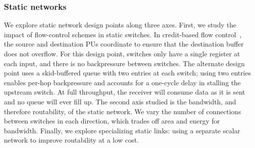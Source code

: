 \subsubsection{Static networks}
We explore static network design points along three axes. 
First, we study the impact of flow-control schemes in static switches. 
In credit-based flow control~\cite{wang2013avoiding}, the source and destination PUs coordinate to ensure that the destination buffer does not overflow.
For this design point, switches only have a single register at each input, and there is no backpressure between switches.
%
The alternate design point uses a skid-buffered queue with two entries at each switch; using two entries enables per-hop backpressure and accounts for a one-cycle delay in stalling the upstream switch.
At full throughput, the receiver will consume data as it is sent and no queue will ever fill up.
%
The second axis studied is the bandwidth, and therefore routability, of the static network. 
We vary the number of connections between switches in each direction, which trades off area and energy for bandwidth.
Finally, we explore specializing static links: using a separate scalar network to improve routability at a low cost.

